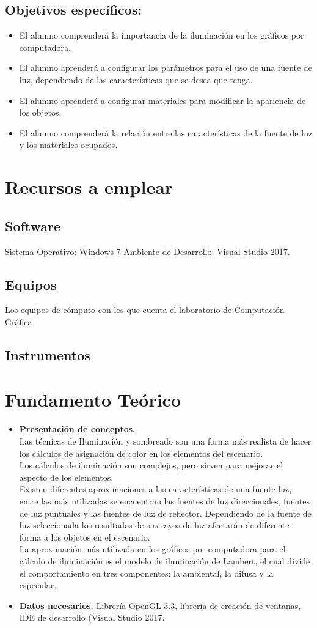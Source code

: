 \documentclass[11pt, english]{article}
\begin{document}
\subsection{Objetivos específicos:}
\begin{itemize}
\item El alumno comprenderá la importancia de la iluminación en los gráficos por
computadora.
\item El alumno aprenderá a configurar los parámetros para el uso de una fuente de luz,
dependiendo de las características que se desea que tenga.
\item El alumno aprenderá a configurar materiales para modificar la apariencia de los
objetos.
\item El alumno comprenderá la relación entre las características de la fuente de luz y
los materiales ocupados.
\end{itemize}
\section{Recursos a emplear}
\subsection{Software}
Sistema Operativo: Windows 7
Ambiente de Desarrollo: Visual Studio 2017.
\subsection{Equipos}
Los equipos de cómputo con los que cuenta el laboratorio de Computación Gráfica
\subsection{Instrumentos}
\section{Fundamento Teórico}
\begin{itemize}
\item \textbf{Presentación de conceptos.} \\
Las técnicas de Iluminación y sombreado son una forma más realista de hacer los
cálculos de asignación de color en los elementos del escenario.\\
Los cálculos de iluminación son complejos, pero sirven para mejorar el aspecto de
los elementos.\\
Existen diferentes aproximaciones a las características de una fuente luz, entre las
más utilizadas se encuentran las fuentes de luz direccionales, fuentes de luz puntuales y las
fuentes de luz de reflector. Dependiendo de la fuente de luz seleccionada los resultados de
sus rayos de luz afectarán de diferente forma a los objetos en el escenario.\\
La aproximación más utilizada en los gráficos por computadora para el cálculo de
iluminación es el modelo de iluminación de Lambert, el cual divide el comportamiento en
tres componentes: la ambiental, la difusa y la especular.
\item \textbf{Datos necesarios.}
Librería OpenGL 3.3, librería de creación de ventanas, IDE de desarrollo (Visual Studio 2017.
\end{itemize}
\end{document}
